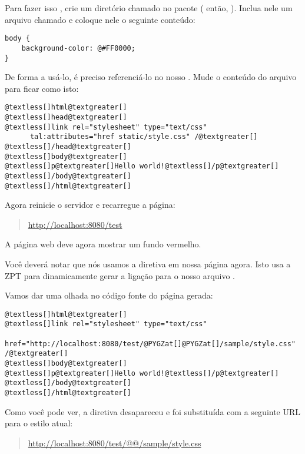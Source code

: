 \documentclass[a4paper,12pt,portuguese]{manual}
\begin{document}
Para fazer isso , crie um diretório chamado  no pacote
 ( então, ). Inclua nele um arquivo
chamado  e coloque nele o seguinte conteúdo:

\begin{Verbatim}[commandchars=@\[\]]
body {
    background-color: @#FF0000;
}
\end{Verbatim}

De forma a usá-lo, é preciso referenciá-lo no nosso  .
Mude o conteúdo do arquivo  para ficar como isto:

\begin{Verbatim}[commandchars=@\[\]]
@textless[]html@textgreater[]
@textless[]head@textgreater[]
@textless[]link rel="stylesheet" type="text/css" 
      tal:attributes="href static/style.css" /@textgreater[]
@textless[]/head@textgreater[]
@textless[]body@textgreater[]
@textless[]p@textgreater[]Hello world!@textless[]/p@textgreater[]
@textless[]/body@textgreater[]
@textless[]/html@textgreater[]
\end{Verbatim}

Agora reinicie o servidor e recarregue a página:
\begin{quote}

\href{http://localhost:8080/test}{http://localhost:8080/test}
\end{quote}

A página web deve agora mostrar um fundo vermelho.

Você deverá notar que nós usamos a diretiva  em
nossa página  agora. Isto usa a ZPT para
dinamicamente gerar a ligação para o nosso arquivo .

Vamos dar uma olhada no  código fonte do página gerada:

\begin{Verbatim}[commandchars=@\[\]]
@textless[]html@textgreater[]
@textless[]link rel="stylesheet" type="text/css"
      href="http://localhost:8080/test/@PYGZat[]@PYGZat[]/sample/style.css" /@textgreater[]
@textless[]body@textgreater[]
@textless[]p@textgreater[]Hello world!@textless[]/p@textgreater[]
@textless[]/body@textgreater[]
@textless[]/html@textgreater[]
\end{Verbatim}

Como você pode ver, a diretiva  desapareceu e foi
substituída com a seguinte URL para o estilo atual:
\begin{quote}

\href{http://localhost:8080/test/@@/sample/style.css}{http://localhost:8080/test/@@/sample/style.css}
\end{quote}
\end{document}
